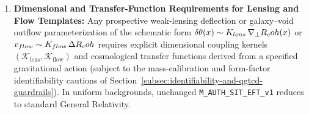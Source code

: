 \begin{enumerate}[leftmargin=2em]
\begin{equation}
  \label{eq:hubble_shift_corrected}
  \end{equation}
  (correcting the erroneous factor $1/(6\rho_{\mathrm{tot}})$ printed in earlier drafts). Whether $\langle\Rcoh\rangle(z)$ evolves cosmologically in a way consistent with CMB acoustic peaks, BAO, and supernova data remains an open Level-1 calculation (\texttt{OPEN-6D}).
  \item \textbf{Dimensional and Transfer-Function Requirements for Lensing and Flow Templates:} Any prospective weak-lensing deflection or galaxy--void outflow parameterization of the schematic form $\delta\theta(x) \sim K_{lens}\,\nabla_\perp R_coh(x)$ or $v_{flow} \sim K_{flow}\,\Delta R_coh$ requires explicit dimensional coupling kernels $(\mathcal{K}_{\mathrm{lens}}, \mathcal{K}_{\mathrm{flow}})$ and cosmological transfer functions derived from a specified gravitational action (subject to the mass-calibration and form-factor identifiability cautions of Section~\ref{subsec:identifiability-and-qgtcd-guardrails}). In uniform backgrounds, unchanged \texttt{M\_AUTH\_SIT\_EFT\_v1} reduces to standard General Relativity.
\end{enumerate}

